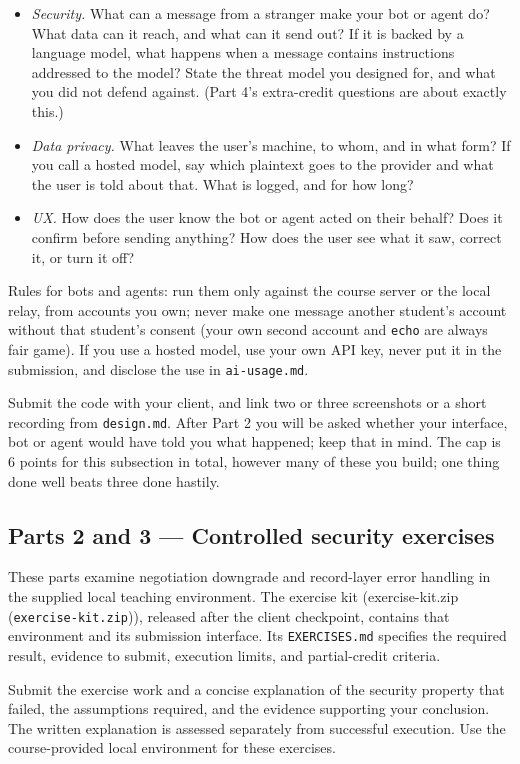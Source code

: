 \documentclass[11pt]{article}
\newcommand{\file}[1]{\texttt{#1}}
\begin{document}
\begin{itemize}
\item \emph{Security.} What can a message from a stranger make your bot or agent do? What data can it reach, and what can it send out? If it is backed by a language model, what happens when a message contains instructions addressed to the model? State the threat model you designed for, and what you did not defend against. (Part 4's extra-credit questions are about exactly this.)
\item \emph{Data privacy.} What leaves the user's machine, to whom, and in what form? If you call a hosted model, say which plaintext goes to the provider and what the user is told about that. What is logged, and for how long?
\item \emph{UX.} How does the user know the bot or agent acted on their behalf? Does it confirm before sending anything? How does the user see what it saw, correct it, or turn it off?
\end{itemize}
Rules for bots and agents: run them only against the course server or the local relay, from accounts you own; never make one message another student's account without that student's consent (your own second account and \texttt{echo} are always fair game). If you use a hosted model, use your own API key, never put it in the submission, and disclose the use in \texttt{ai-{}usage.md}.

Submit the code with your client, and link two or three screenshots or a short recording from \texttt{design.md}. After Part 2 you will be asked whether your interface, bot or agent would have told you what happened; keep that in mind. The cap is 6 points for this subsection in total, however many of these you build; one thing done well beats three done hastily.

\subsection*{Parts 2 and 3 --- Controlled security exercises}

These parts examine negotiation downgrade and record-layer error handling in the supplied local teaching environment. The exercise kit (exercise-kit.zip (\file{exercise-{}kit.zip})), released after the client checkpoint, contains that environment and its submission interface. Its \texttt{EXERCISES.md} specifies the required result, evidence to submit, execution limits, and partial-credit criteria.

Submit the exercise work and a concise explanation of the security property that failed, the assumptions required, and the evidence supporting your conclusion. The written explanation is assessed separately from successful execution. Use the course-provided local environment for these exercises.
\end{document}
